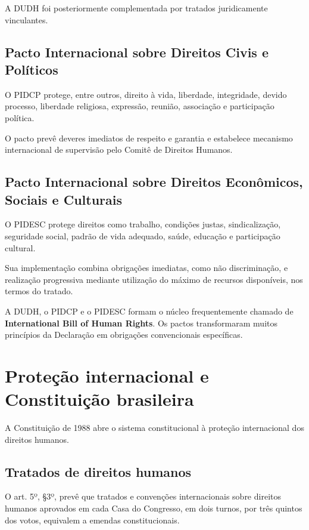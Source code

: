 A DUDH foi posteriormente complementada por tratados juridicamente vinculantes.

\subsection{Pacto Internacional sobre Direitos Civis e Políticos}

O PIDCP protege, entre outros, direito à vida, liberdade, integridade, devido processo, liberdade religiosa, expressão, reunião, associação e participação política.

O pacto prevê deveres imediatos de respeito e garantia e estabelece mecanismo internacional de supervisão pelo Comitê de Direitos Humanos.

\subsection{Pacto Internacional sobre Direitos Econômicos, Sociais e Culturais}

O PIDESC protege direitos como trabalho, condições justas, sindicalização, seguridade social, padrão de vida adequado, saúde, educação e participação cultural.

Sua implementação combina obrigações imediatas, como não discriminação, e realização progressiva mediante utilização do máximo de recursos disponíveis, nos termos do tratado.

\begin{teoria}
A DUDH, o PIDCP e o PIDESC formam o núcleo frequentemente chamado de \textbf{International Bill of Human Rights}. Os pactos transformaram muitos princípios da Declaração em obrigações convencionais específicas.
\end{teoria}

\section{Proteção internacional e Constituição brasileira}

A Constituição de 1988 abre o sistema constitucional à proteção internacional dos direitos humanos.

\subsection{Tratados de direitos humanos}

O art. 5º, §3º, prevê que tratados e convenções internacionais sobre direitos humanos aprovados em cada Casa do Congresso, em dois turnos, por três quintos dos votos, equivalem a emendas constitucionais.

